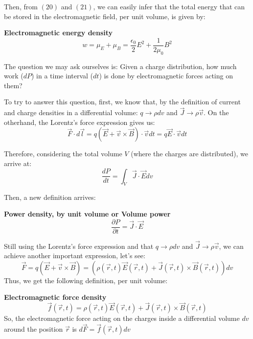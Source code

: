 \documentclass[11pt]{article}
\theoremstyle{definition}
\begin{document}
Then, from $(20)$ and $(21)$, we can easily infer that the total energy that can be stored in the electromagnetic field, per unit volume, is given by:
\begin{shaded}
    \textbf{Electromagnetic energy density}
    \begin{equation}
        w = \mu_{E} + \mu_{B} = \frac{\epsilon_{0}}{2}E^2 + \frac{1}{2\mu_{0}}B^2
    \end{equation}
\end{shaded}

The question we may ask ourselves is: Given a charge distribution, how much work ($dP$) in a time interval ($dt$) is done by electromagnetic forces acting on them?

To try to answer this question, first, we know that, by the definition of current and charge densities in a differential volume: $q \rightarrow \rho dv$ and $\vec{J} \rightarrow \rho \vec{v}$. On the otherhand,
 the Lorentz's force expression gives us:
\begin{equation}
    \vec{F} \cdot d\vec{l} = q\left(\vec{E}+\vec{v}\times \vec{B}\right) \cdot \vec{v}dt = q\vec{E} \cdot \vec{v}dt
\end{equation}

Therefore, considering the total volume $V$ (where the charges are distributed), we arrive at:
\begin{equation}
    \frac{dP}{dt} = \int_{V}\vec{J} \cdot \vec{E}dv
\end{equation}

Then, a new definition arrives:
\begin{shaded}
    \textbf{Power density, by unit volume or Volume power}
    \begin{equation}
        \frac{\partial P}{\partial t} = \vec{J} \cdot \vec{E}
    \end{equation}
\end{shaded}

Still using the Lorentz's force expression and that $q \rightarrow \rho dv$ and $\vec{J} \rightarrow \rho \vec{v}$, we can achieve another important expression, let's see:
\begin{equation}
    \vec{F} = q\left(\vec{E}+\vec{v} \times \vec{B}\right) = \left(\rho\left(\vec{r},t\right)\vec{E}\left(\vec{r},t\right) + \vec{J}\left(\vec{r},t\right) \times \vec{B}\left(\vec{r},t\right)\right)dv
\end{equation}
Thus, we get the following definition, per unit volume:
\begin{shaded}
    \textbf{Electromagnetic force density}
    \begin{equation}
        \vec{f}\left(\vec{r},t\right) = \rho\left(\vec{r},t\right)\vec{E}\left(\vec{r},t\right) + \vec{J}\left(\vec{r},t\right) \times \vec{B}\left(\vec{r},t\right)
    \end{equation}
So, the electromagnetic force acting on the charges inside a differential volume $dv$ around the position $\vec{r}$ is $d\vec{F} = \vec{f}\left(\vec{r},t\right)dv$
\end{shaded}
\end{document}
